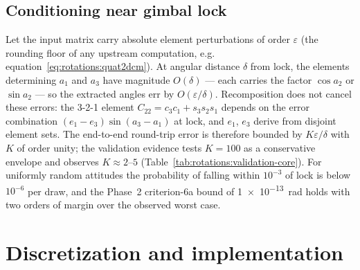 \subsection{Conditioning near gimbal lock}

Let the input matrix carry absolute element perturbations of order
$\varepsilon$ (the rounding floor of any upstream computation, e.g.
equation~\eqref{eq:rotations:quat2dcm}). At angular distance $\delta$ from
lock, the elements determining $a_1$ and $a_3$ have magnitude
$O(\delta)$ --- each carries the factor $\cos a_2$ or $\sin a_2$ --- so the
extracted angles err by $O(\varepsilon/\delta)$. Recomposition does not
cancel these errors: the 3-2-1 element $C_{22} = c_3 c_1 + s_3 s_2 s_1$
depends on the error combination $(e_1 - e_3)\sin(a_3 - a_1)$ at lock, and
$e_1$, $e_3$ derive from disjoint element sets. The end-to-end round-trip
error is therefore bounded by $K \varepsilon / \delta$ with $K$ of order
unity; the validation evidence tests $K = 100$ as a conservative envelope
and observes $K \approx 2$--$5$
(Table~\ref{tab:rotations:validation-core}). For uniformly random
attitudes the probability of falling within $10^{-3}$ of lock is below
$10^{-6}$ per draw, and the Phase~2 criterion-6a bound of
\qty{1e-13}{\radian} holds with two orders of margin over the observed
worst case.

\section{Discretization and implementation}
\label{sec:rotations:implementation}

